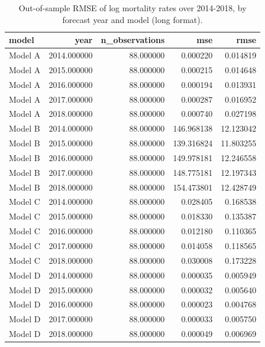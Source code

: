 \begin{table}[ht]
\centering
\begin{tabular}{lrrrr}
\hline
model & year & n_observations & mse & rmse \\
\hline
Model A & 2014.000000 & 88.000000 & 0.000220 & 0.014819 \\
Model A & 2015.000000 & 88.000000 & 0.000215 & 0.014648 \\
Model A & 2016.000000 & 88.000000 & 0.000194 & 0.013931 \\
Model A & 2017.000000 & 88.000000 & 0.000287 & 0.016952 \\
Model A & 2018.000000 & 88.000000 & 0.000740 & 0.027198 \\
Model B & 2014.000000 & 88.000000 & 146.968138 & 12.123042 \\
Model B & 2015.000000 & 88.000000 & 139.316824 & 11.803255 \\
Model B & 2016.000000 & 88.000000 & 149.978181 & 12.246558 \\
Model B & 2017.000000 & 88.000000 & 148.775181 & 12.197343 \\
Model B & 2018.000000 & 88.000000 & 154.473801 & 12.428749 \\
Model C & 2014.000000 & 88.000000 & 0.028405 & 0.168538 \\
Model C & 2015.000000 & 88.000000 & 0.018330 & 0.135387 \\
Model C & 2016.000000 & 88.000000 & 0.012180 & 0.110365 \\
Model C & 2017.000000 & 88.000000 & 0.014058 & 0.118565 \\
Model C & 2018.000000 & 88.000000 & 0.030008 & 0.173228 \\
Model D & 2014.000000 & 88.000000 & 0.000035 & 0.005949 \\
Model D & 2015.000000 & 88.000000 & 0.000032 & 0.005640 \\
Model D & 2016.000000 & 88.000000 & 0.000023 & 0.004768 \\
Model D & 2017.000000 & 88.000000 & 0.000033 & 0.005750 \\
Model D & 2018.000000 & 88.000000 & 0.000049 & 0.006969 \\
\hline
\end{tabular}
\caption{Out-of-sample RMSE of log mortality rates over 2014-2018, by forecast year and model (long format).}
\label{tab:revised_table_e2_long}
\end{table}
